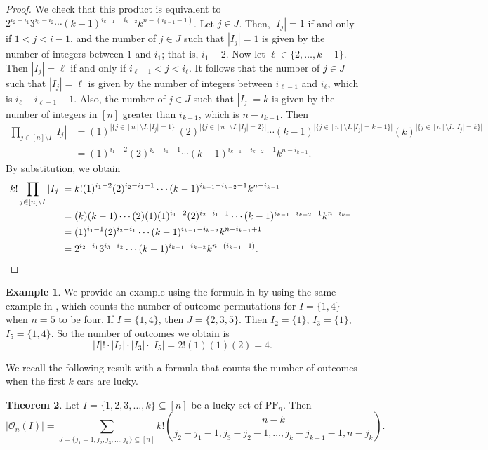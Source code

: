\documentclass[reqno]{amsart}
\newcommand{\PF}{\mathrm{PF}}
\newcommand{\al}[1]{\begin{align*} #1 \end{align*}}
\theoremstyle{definition}
\newtheorem{theorem}{Theorem}[section]
\newtheorem{example}[theorem]{Example}
\theoremstyle{remark}
\newcommand{\out}{\mathcal{O}}
\begin{document}
\begin{proof}
We check that this product is equivalent to $2^{i_2-i_1} 3^{i_3-i_2} \cdots (k-1)^{i_{k-1} - i_{k-2}} k^{n -(i_{k-1}-1)}$. Let $j \in J$.
Then, $|I_j|=1$ if and only if $1 <j <i-1$, and the
number of $j\in J$ such that $|I_j| = 1$ is given by the number of integers between $1$ and $i_1$; that is, $i_1-2$.
Now let $\ell \in \{2,\ldots, k-1\}$. Then $|I_j| = \ell$ if and only if $i_{\ell-1}<j <i_\ell$. 
It follows that the number of $j\in J$ such that $|I_j| = \ell$ is given by the number of integers  between $i_{\ell-1}$ and $i_\ell$, which is $i_{\ell}-i_{\ell-1}-1$.
Also, the number of $j\in J$ such that $|I_j| = k$ is given by the number of integers in $[n]$ greater than $i_{k-1}$, which is $n-i_{k-1}$.
Then
\al{
\prod_{j\in [n]\setminus I} |I_j| &= (1)^{|\{ j \in [n
] \setminus I: |I_j| = 1\}|}(2)^{| \{ j \in [n] \setminus I: |I_j| = 2\}|} \cdots (k-1)^{| \{ j \in [n] \setminus I: |I_j| = k-1\}|}(k)^{| \{ j \in [n] \setminus I: |I_j| = k\}|}\\
&= (1)^{i_1-2}(2)^{i_2-i_1-1} \cdots(k-1)^{i_{k-1}-i_{k-2}-1} k^{n-i_{k-1}}.
}
By substitution, we obtain
\al{
k! \prod_{j\in [n]\setminus I} |I_j| &= k! (1)^{i_1-2}(2)^{i_2-i_1-1} \cdots (k-1)^{i_{k-1}-i_{k-2}-1}k^{n-i_{k-1}}\\
&= (k)(k-1)\cdots(2)(1) (1)^{i_1-2}(2)^{i_2-i_1-1} \cdots (k-1)^{i_{k-1}-i_{k-2}-1} k^{n-i_{k-1}}\\
&= (1)^{i_1-1}(2)^{i_2-i_1} \cdots (k-1)^{i_{k-1}-i_{k-2}} k^{n-i_{k-1}+1}\\
&= 2^{i_2-i_1} 3^{i_3-i_2} \cdots (k-1)^{i_{k-1} - i_{k-2}} k^{n -(i_{k-1}-1)}.\qedhere
}
\end{proof}


\begin{example}
 We provide an example using the formula in  by using the same example in \cite[Example 2]{harrismartinez}, which counts the number of outcome permutations for $I = \{1,4\}$ when $n=5$ to be four. 
 If $I = \{1,4\}$, then $J=\{2,3,5\}$. 
Then $I_2 = \{1\}$, $I_3 = \{1\}$, $I_5=\{1,4\}$.
So the number of outcomes we obtain is 
\[
|I|! \cdot |I_2| \cdot |I_3| \cdot |I_5| = 2!(1)(1)(2) = 4.
\]
\end{example}

We recall the following result with a formula that counts the number of outcomes when the first $k$ cars are lucky.


\begin{theorem}{\cite[Theorem 2.4]{harrismartinez}}
 Let $I=\{1,2,3,\ldots,k\}\subseteq[n]$ be a lucky set of $\PF_n$. Then 
\[|\out_n(I)|=\sum_{J=\{j_1=1,j_2,j_3,\ldots,j_k\}\subseteq[n]}k!\binom{n-k}{j_2-j_1-1,j_3-j_2-1,\ldots,j_{k}-j_{k-1}-1,n-j_{k}}.\] 
\end{theorem}
\end{document}

